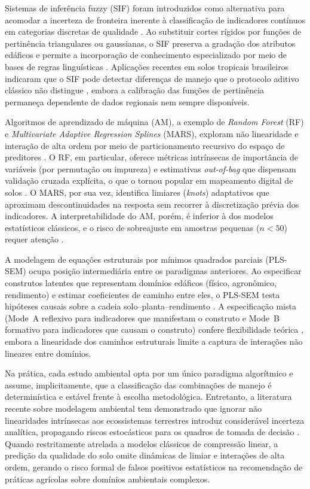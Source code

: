 \documentclass[pdflatex,sn-basic]{sn-jnl}%
\begin{document}
Sistemas de inferência fuzzy (SIF) foram introduzidos como alternativa para acomodar a incerteza de fronteira inerente à classificação de indicadores contínuos em categorias discretas de qualidade \cite{Torbert2008}. Ao substituir cortes rígidos por funções de pertinência triangulares ou gaussianas, o SIF preserva a gradação dos atributos edáficos e permite a incorporação de conhecimento especializado por meio de bases de regras linguísticas \cite{Nabiollahi2018}. Aplicações recentes em solos tropicais brasileiros indicaram que o SIF pode detectar diferenças de manejo que o protocolo aditivo clássico não distingue \cite{DosSantos2021}, embora a calibração das funções de pertinência permaneça dependente de dados regionais nem sempre disponíveis.

Algoritmos de aprendizado de máquina (AM), a exemplo de \textit{Random Forest} (RF) e \textit{Multivariate Adaptive Regression Splines} (MARS), exploram não linearidade e interação de alta ordem por meio de particionamento recursivo do espaço de preditores \cite{Zeraatpisheh2020}. O RF, em particular, oferece métricas intrínsecas de importância de variáveis (por permutação ou impureza) e estimativas \textit{out-of-bag} que dispensam validação cruzada explícita, o que o tornou popular em mapeamento digital de solos \cite{Wadoux2020}. O MARS, por sua vez, identifica limiares (\textit{knots}) adaptativos que aproximam descontinuidades na resposta sem recorrer à discretização prévia dos indicadores. A interpretabilidade do AM, porém, é inferior à dos modelos estatísticos clássicos, e o risco de sobreajuste em amostras pequenas ($n < 50$) requer atenção \cite{Chaudhry2024}.

A modelagem de equações estruturais por mínimos quadrados parciais (PLS-SEM) ocupa posição intermediária entre os paradigmas anteriores. Ao especificar construtos latentes que representam domínios edáficos (físico, agronômico, rendimento) e estimar coeficientes de caminho entre eles, o PLS-SEM testa hipóteses causais sobre a cadeia solo--planta--rendimento \cite{Hair2019,Sarstedt2022}. A especificação mista (Mode~A reflexivo para indicadores que manifestam o construto e Mode~B formativo para indicadores que causam o construto) confere flexibilidade teórica \cite{Diamantopoulos2008}, embora a linearidade dos caminhos estruturais limite a captura de interações não lineares entre domínios.

Na prática, cada estudo ambiental opta por um único paradigma algorítmico e assume, implicitamente, que a classificação das combinações de manejo é determinística e estável frente à escolha metodológica. Entretanto, a literatura recente sobre modelagem ambiental tem demonstrado que ignorar não linearidades intrínsecas aos ecossistemas terrestres introduz considerável incerteza analítica, propagando riscos estocásticos para os quadros de tomada de decisão \cite{Yoshioka2024,Brito2024}. Quando restritamente atrelada a modelos clássicos de compressão linear, a predição da qualidade do solo omite dinâmicas de limiar e interações de alta ordem, gerando o risco formal de falsos positivos estatísticos na recomendação de práticas agrícolas sobre domínios ambientais complexos.
\end{document}
